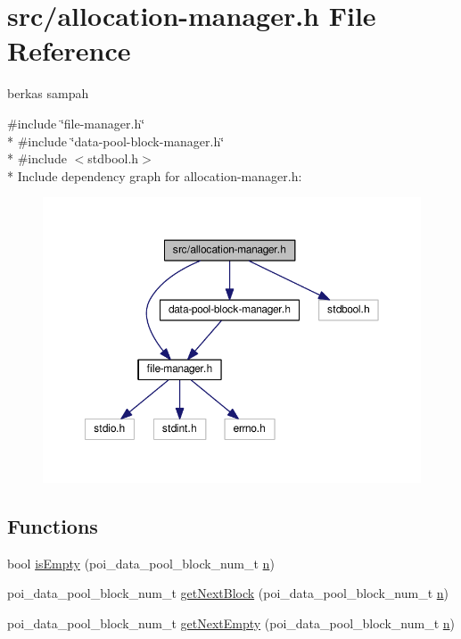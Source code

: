 \hypertarget{allocation-manager_8h}{\section{src/allocation-\/manager.h File Reference}
\label{allocation-manager_8h}
}


berkas sampah  


{\ttfamily \#include \char`\"{}file-\/manager.\-h\char`\"{}}\\*
{\ttfamily \#include \char`\"{}data-\/pool-\/block-\/manager.\-h\char`\"{}}\\*
{\ttfamily \#include $<$stdbool.\-h$>$}\\*
Include dependency graph for allocation-\/manager.h\-:\nopagebreak
\begin{figure}[H]
\begin{center}
\leavevmode
\includegraphics[width=350pt]{allocation-manager_8h__incl}
\end{center}
\end{figure}
\subsection*{Functions}
\begin{DoxyCompactItemize}
\item 
bool \hyperlink{allocation-manager_8h_a56b807a333a2fc6f627265865c1e9f7d}{is\-Empty} (poi\-\_\-data\-\_\-pool\-\_\-block\-\_\-num\-\_\-t \hyperlink{allocation-table-test_8c_a24010dade8ebab3f87a48022772cd975}{n})
\item 
poi\-\_\-data\-\_\-pool\-\_\-block\-\_\-num\-\_\-t \hyperlink{allocation-manager_8h_aac60c48ce4acad3a1d8e459ba5649259}{get\-Next\-Block} (poi\-\_\-data\-\_\-pool\-\_\-block\-\_\-num\-\_\-t \hyperlink{allocation-table-test_8c_a24010dade8ebab3f87a48022772cd975}{n})
\item 
poi\-\_\-data\-\_\-pool\-\_\-block\-\_\-num\-\_\-t \hyperlink{allocation-manager_8h_a98a30f2070bd2d0ace14f19f86484d16}{get\-Next\-Empty} (poi\-\_\-data\-\_\-pool\-\_\-block\-\_\-num\-\_\-t \hyperlink{allocation-table-test_8c_a24010dade8ebab3f87a48022772cd975}{n})
\end{DoxyCompactItemize}
